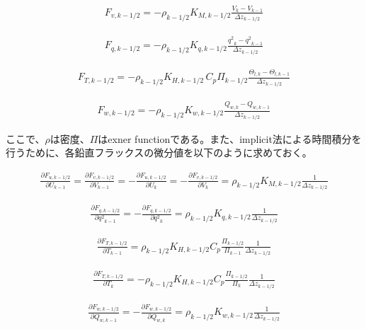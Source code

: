 \begin{eqnarray}F_{v,k-1/2}=-\rho_{k-1/2}K_{M,k-1/2}\frac{V_{k}-V_{k-1}}{\Delta z_{k-1/2}}\end{eqnarray}

\begin{eqnarray}F_{q,k-1/2}=-\rho_{k-1/2}K_{q,k-1/2}\frac{{q^2}_ {k}-{q^2}_ {k-1}}{\Delta z_{k-1/2}}\end{eqnarray}

\begin{eqnarray}F_{T,k-1/2}=-\rho_{k-1/2}K_{H,k-1/2}\,C_p\Pi_{k-1/2}\frac{\Theta_{l,k}-\Theta_{l,k-1}}{\Delta z_{k-1/2}}\end{eqnarray}

\begin{eqnarray}F_{w,k-1/2}=-\rho_{k-1/2}K_{w,k-1/2}\frac{Q_{w,k}-Q_{w,k-1}}{\Delta z_{k-1/2}}\end{eqnarray}

ここで、\(\rho\)は密度、\(\Pi\)はexner
functionである。また、implicit法による時間積分を行うために、各鉛直フラックスの微分値を以下のように求めておく。

\begin{eqnarray}\frac{\partial F_{u,k-1/2}}{\partial U_{k-1}}=\frac{\partial F_{v,k-1/2}}{\partial V_{k-1}}=-\frac{\partial F_{u,k-1/2}}{\partial U_{k}}=-\frac{\partial F_{v,k-1/2}}{\partial V_{k}}=\rho_{k-1/2}K_{M,k-1/2}\frac{1}{\Delta z_{k-1/2}}\end{eqnarray}

\begin{eqnarray}\frac{\partial F_{q,k-1/2}}{\partial {q^2}_ {k-1}}=-\frac{\partial F_{q,k-1/2}}{\partial {q^2}_ {k}}=\rho_{k-1/2}K_{q,k-1/2}\frac{1}{\Delta z_{k-1/2}}\end{eqnarray}

\begin{eqnarray}\frac{\partial F_{T,k-1/2}}{\partial T_{k-1}}=\rho_{k-1/2}K_{H,k-1/2}C_p\frac{\Pi_{k-1/2}}{\Pi_{k-1}}\frac{1}{\Delta z_{k-1/2}}\end{eqnarray}

\begin{eqnarray}\frac{\partial F_{T,k-1/2}}{\partial T_{k}}=-\rho_{k-1/2}K_{H,k-1/2}C_p\frac{\Pi_{k-1/2}}{\Pi_{k}}\frac{1}{\Delta z_{k-1/2}}\end{eqnarray}

\begin{eqnarray}\frac{\partial F_{w,k-1/2}}{\partial Q_{w,k-1}}=-\frac{\partial F_{w,k-1/2}}{\partial Q_{w,k}}=\rho_{k-1/2}K_{w,k-1/2}\frac{1}{\Delta z_{k-1/2}}\end{eqnarray}

